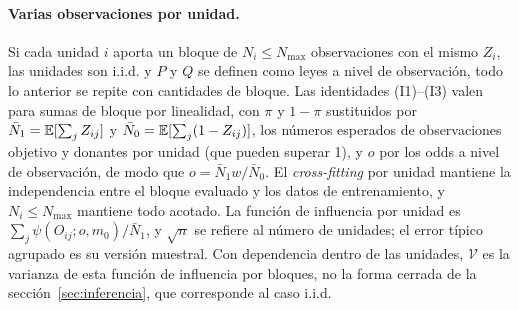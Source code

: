 \paragraph{Varias observaciones por unidad.} Si cada unidad $i$ aporta un bloque de $N_i\le N_{\max}$ observaciones con el mismo $Z_i$, las unidades son i.i.d. y $P$ y $Q$ se definen como leyes a nivel de observación, todo lo anterior se repite con cantidades de bloque. Las identidades (I1)--(I3) valen para sumas de bloque por linealidad, con $\pi$ y $1-\pi$ sustituidos por $\bar N_1=\mathbb{E}[\sum_jZ_{ij}]$ y $\bar N_0=\mathbb{E}[\sum_j(1-Z_{ij})]$, los números esperados de observaciones objetivo y donantes por unidad (que pueden superar 1), y $o$ por los odds a nivel de observación, de modo que $o=\bar N_1w/\bar N_0$. El \emph{cross-fitting} por unidad mantiene la independencia entre el bloque evaluado y los datos de entrenamiento, y $N_i\le N_{\max}$ mantiene todo acotado. La función de influencia por unidad es $\sum_j\psi(O_{ij};o,m_0)/\bar N_1$, y $\sqrt n$ se refiere al número de unidades; el error típico agrupado es su versión muestral. Con dependencia dentro de las unidades, $\mathcal V$ es la varianza de esta función de influencia por bloques, no la forma cerrada de la sección~\ref{sec:inferencia}, que corresponde al caso i.i.d.

